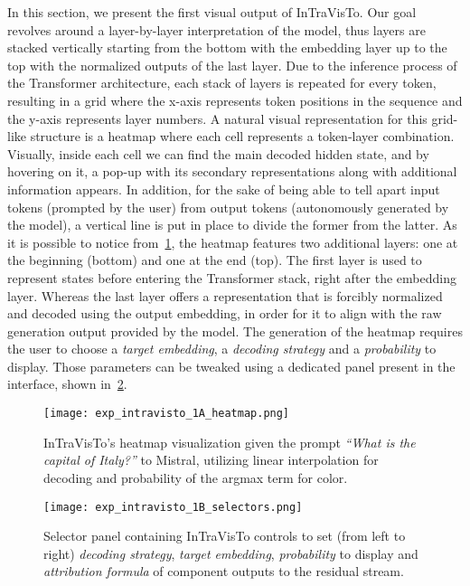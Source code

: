In this section, we present the first visual output of InTraVisTo.
Our goal revolves around a layer-by-layer interpretation of the model, thus layers are stacked vertically starting from the bottom with the embedding layer up to the top with the normalized outputs of the last layer.
Due to the inference process of the Transformer architecture, each stack of layers is repeated for every token, resulting in a grid where the x-axis represents token positions in the sequence and the y-axis represents layer numbers.
A natural visual representation for this grid-like structure is a heatmap where each cell represents a token-layer combination.
Visually, inside each cell we can find the main decoded hidden state, and by hovering on it, a pop-up with its secondary representations along with additional information appears.
In addition, for the sake of being able to tell apart input tokens (prompted by the user) from output tokens (autonomously generated by the model), a vertical line is put in place to divide the former from the latter.
As it is possible to notice from~\cref{fig:exp_intravisto_1_A}, the heatmap features two additional layers: one at the beginning (bottom) and one at the end (top).
The first layer is used to represent states before entering the Transformer stack, right after the embedding layer.
Whereas the last layer offers a representation that is forcibly normalized and decoded using the output embedding, in order for it to align with the raw generation output provided by the model.
The generation of the heatmap requires the user to choose a \emph{target embedding}, a \emph{decoding strategy} and a \emph{probability} to display.
Those parameters can be tweaked using a dedicated panel present in the interface, shown in~\cref{fig:exp_intravisto_1_B}.

\begin{figure}[t!]
    \centering
    \texttt{[image: exp\_intravisto\_1A\_heatmap.png]}
    \caption[InTraVisTo's heatmap visualization given the prompt \emph{``What is the capital of Italy?''} to Mistral.]{InTraVisTo's heatmap visualization given the prompt \emph{``What is the capital of Italy?''} to Mistral, utilizing linear interpolation for decoding and probability of the argmax term for color.}
    \label{fig:exp_intravisto_1_A}
\end{figure}

\begin{figure}[t!]
    \centering
    \texttt{[image: exp\_intravisto\_1B\_selectors.png]}
    \caption[Selector panel containing InTraVisTo controls.]{Selector panel containing InTraVisTo controls to set (from left to right) \emph{decoding strategy}, \emph{target embedding}, \emph{probability} to display and \emph{attribution formula} of component outputs to the residual stream.}
    \label{fig:exp_intravisto_1_B}
\end{figure}

